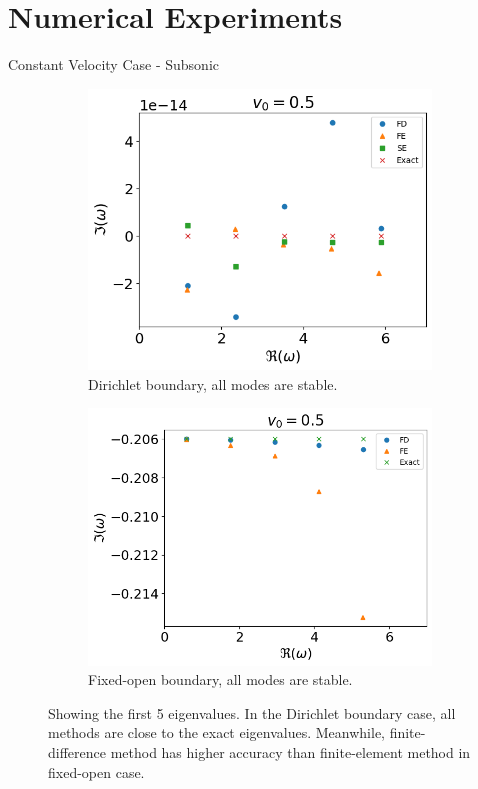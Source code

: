\section{Numerical Experiments}
\begin{frame}{Constant Velocity Case - Subsonic}
    \begin{figure}[H]
    \centering
    \begin{subfigure}{0.45\textwidth}
      \includegraphics[width=0.9\linewidth]{../../thesis/img/numerical-experiments/fixed-fixed/constant-v-v0=0.5}
      \caption{Dirichlet boundary, all modes are stable.}
    \end{subfigure}%
    \begin{subfigure}{0.45\textwidth}
      \includegraphics[width=\linewidth]{../../thesis/img/numerical-experiments/fixed-open/constant-v-v0=0.5}
      \caption{Fixed-open boundary, all modes are stable.}
    \end{subfigure}
    \caption{Showing the first 5 eigenvalues. In the Dirichlet boundary case, all methods are close to the exact eigenvalues. Meanwhile, finite-difference method has higher accuracy than finite-element method in fixed-open case.}
  \end{figure}
\end{frame}


